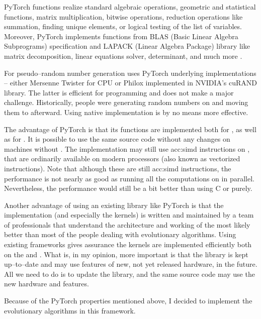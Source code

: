 PyTorch functions realize standard algebraic operations, geometric and statistical functions, matrix multiplication, bitwise operations, reduction operations like summation, finding unique elements, or logical testing of the list of variables. Moreover, PyTorch implements functions from BLAS (Basic Linear Algebra Subprograms) specification and LAPACK (Linear Algebra Package) library like matrix decomposition, linear equations solver, determinant, and much more \citep{PyTorchDoc}.

For pseudo--random number generation uses PyTorch underlying implementations -- either Mersenne Twister for CPU or Philox implemented in NVIDIA's cuRAND library. The latter is efficient for \cuda programming and does not make a major challenge. Historically, people were generating random numbers on \cpu and moving them to \gpu afterward. Using native \cuda implementation is by no means more effective.

The advantage of PyTorch is that its functions are implemented both for \cpuns, as well as for \gpuns. It is possible to use the same source code without any changes on machines without \gpuns. The implementation may still use \acrshort{acc:simd} instructions on \cpuns, that are ordinarily available on modern processors (also known as vectorized instructions). Note that although these are still \acrshort{acc:simd} instructions, the performance is not nearly as good as running all the computations on \gpu in parallel. Nevertheless, the performance would still be a bit better than using C or \cppns purely.

Another advantage of using an existing library like PyTorch is that the implementation (and especially the \cuda kernels) is written and maintained by a team of professionals that understand the architecture and working of the \gpu most likely better than most of the people dealing with evolutionary algorithms. Using existing frameworks gives assurance the kernels are implemented efficiently both on the \gpu and \cpuns. What is, in my opinion, more important is that the library is kept up--to--date and may use features of new, not yet released hardware, in the future. All we need to do is to update the library, and the same source code may use the new hardware and features.

Because of the PyTorch properties mentioned above, I decided to implement the evolutionary algorithms in this framework.




